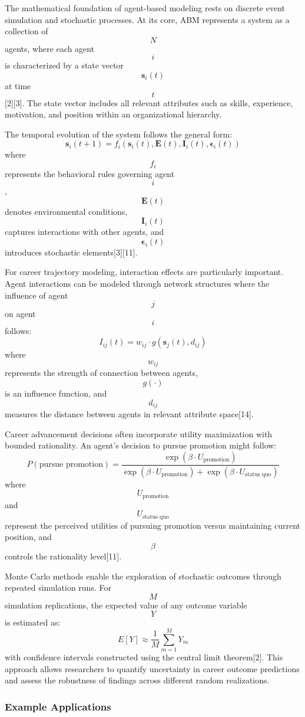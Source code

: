 \documentclass[main.tex]{subfiles}
\begin{document}
The mathematical foundation of agent-based modeling rests on discrete event simulation and stochastic processes. At its core, ABM represents a system as a collection of $$ N $$ agents, where each agent $$ i $$ is characterized by a state vector $$ \mathbf{s}_i(t) $$ at time $$ t $$[2][3]. The state vector includes all relevant attributes such as skills, experience, motivation, and position within an organizational hierarchy.

The temporal evolution of the system follows the general form:
$$
\mathbf{s}_i(t+1) = f_i(\mathbf{s}_i(t), \mathbf{E}(t), \mathbf{I}_i(t), \boldsymbol{\epsilon}_i(t))
$$
where $$ f_i $$ represents the behavioral rules governing agent $$ i $$, $$ \mathbf{E}(t) $$ denotes environmental conditions, $$ \mathbf{I}_i(t) $$ captures interactions with other agents, and $$ \boldsymbol{\epsilon}_i(t) $$ introduces stochastic elements[3][11].

For career trajectory modeling, interaction effects are particularly important. Agent interactions can be modeled through network structures where the influence of agent $$ j $$ on agent $$ i $$ follows:
$$
I_{ij}(t) = w_{ij} \cdot g(\mathbf{s}_j(t), d_{ij})
$$
where $$ w_{ij} $$ represents the strength of connection between agents, $$ g(\cdot) $$ is an influence function, and $$ d_{ij} $$ measures the distance between agents in relevant attribute space[14].

Career advancement decisions often incorporate utility maximization with bounded rationality. An agent's decision to pursue promotion might follow:
$$
P(\text{pursue promotion}) = \frac{\exp(\beta \cdot U_{\text{promotion}})}{\exp(\beta \cdot U_{\text{promotion}}) + \exp(\beta \cdot U_{\text{status quo}})}
$$
where $$ U_{\text{promotion}} $$ and $$ U_{\text{status quo}} $$ represent the perceived utilities of pursuing promotion versus maintaining current position, and $$ \beta $$ controls the rationality level[11].

Monte Carlo methods enable the exploration of stochastic outcomes through repeated simulation runs. For $$ M $$ simulation replications, the expected value of any outcome variable $$ Y $$ is estimated as:
$$
E[Y] \approx \frac{1}{M} \sum_{m=1}^{M} Y_m
$$
with confidence intervals constructed using the central limit theorem[2]. This approach allows researchers to quantify uncertainty in career outcome predictions and assess the robustness of findings across different random realizations.

\subsubsection{Example Applications}
\end{document}

